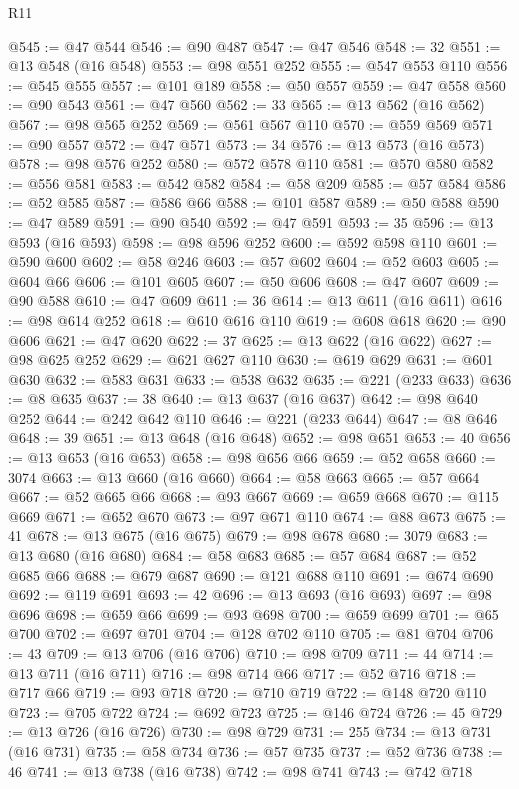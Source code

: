\begin{lexlean}{R11}
\begin{coremodule}
@545 := @47 @544
@546 := @90 @487
@547 := @47 @546
@548 := 32
@551 := @13 @548 (@16 @548)
@553 := @98 @551 @252
@555 := @547 @553 @110
@556 := @545 @555
@557 := @101 @189
@558 := @50 @557
@559 := @47 @558
@560 := @90 @543
@561 := @47 @560
@562 := 33
@565 := @13 @562 (@16 @562)
@567 := @98 @565 @252
@569 := @561 @567 @110
@570 := @559 @569
@571 := @90 @557
@572 := @47 @571
@573 := 34
@576 := @13 @573 (@16 @573)
@578 := @98 @576 @252
@580 := @572 @578 @110
@581 := @570 @580
@582 := @556 @581
@583 := @542 @582
@584 := @58 @209
@585 := @57 @584
@586 := @52 @585
@587 := @586 @66
@588 := @101 @587
@589 := @50 @588
@590 := @47 @589
@591 := @90 @540
@592 := @47 @591
@593 := 35
@596 := @13 @593 (@16 @593)
@598 := @98 @596 @252
@600 := @592 @598 @110
@601 := @590 @600
@602 := @58 @246
@603 := @57 @602
@604 := @52 @603
@605 := @604 @66
@606 := @101 @605
@607 := @50 @606
@608 := @47 @607
@609 := @90 @588
@610 := @47 @609
@611 := 36
@614 := @13 @611 (@16 @611)
@616 := @98 @614 @252
@618 := @610 @616 @110
@619 := @608 @618
@620 := @90 @606
@621 := @47 @620
@622 := 37
@625 := @13 @622 (@16 @622)
@627 := @98 @625 @252
@629 := @621 @627 @110
@630 := @619 @629
@631 := @601 @630
@632 := @583 @631
@633 := @538 @632
@635 := @221 (@233 @633)
@636 := @8 @635
@637 := 38
@640 := @13 @637 (@16 @637)
@642 := @98 @640 @252
@644 := @242 @642 @110
@646 := @221 (@233 @644)
@647 := @8 @646
@648 := 39
@651 := @13 @648 (@16 @648)
@652 := @98 @651
@653 := 40
@656 := @13 @653 (@16 @653)
@658 := @98 @656 @66
@659 := @52 @658
@660 := 3074
@663 := @13 @660 (@16 @660)
@664 := @58 @663
@665 := @57 @664
@667 := @52 @665 @66
@668 := @93 @667
@669 := @659 @668
@670 := @115 @669
@671 := @652 @670
@673 := @97 @671 @110
@674 := @88 @673
@675 := 41
@678 := @13 @675 (@16 @675)
@679 := @98 @678
@680 := 3079
@683 := @13 @680 (@16 @680)
@684 := @58 @683
@685 := @57 @684
@687 := @52 @685 @66
@688 := @679 @687
@690 := @121 @688 @110
@691 := @674 @690
@692 := @119 @691
@693 := 42
@696 := @13 @693 (@16 @693)
@697 := @98 @696
@698 := @659 @66
@699 := @93 @698
@700 := @659 @699
@701 := @65 @700
@702 := @697 @701
@704 := @128 @702 @110
@705 := @81 @704
@706 := 43
@709 := @13 @706 (@16 @706)
@710 := @98 @709
@711 := 44
@714 := @13 @711 (@16 @711)
@716 := @98 @714 @66
@717 := @52 @716
@718 := @717 @66
@719 := @93 @718
@720 := @710 @719
@722 := @148 @720 @110
@723 := @705 @722
@724 := @692 @723
@725 := @146 @724
@726 := 45
@729 := @13 @726 (@16 @726)
@730 := @98 @729
@731 := 255
@734 := @13 @731 (@16 @731)
@735 := @58 @734
@736 := @57 @735
@737 := @52 @736
@738 := 46
@741 := @13 @738 (@16 @738)
@742 := @98 @741
@743 := @742 @718

\end{coremodule}
\end{lexlean}
